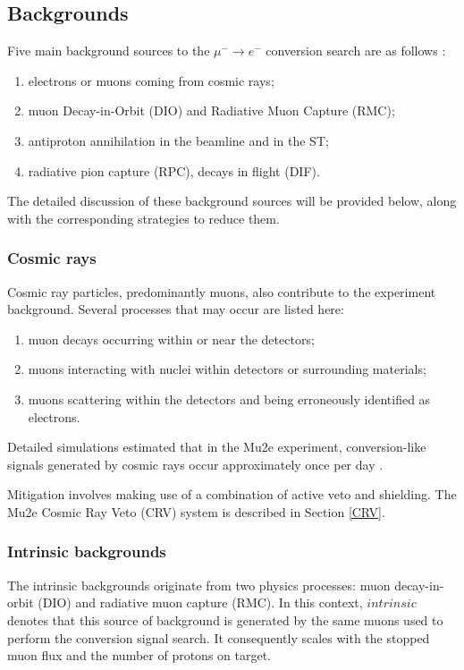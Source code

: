 \subsection{Backgrounds}\label{backgrounds}
Five main background sources to the $\mu^- \to e^-$ conversion search are as follows \cite{bartoszek2015mu2e}:
\begin{enumerate}
\item electrons or muons coming from cosmic rays;
\item muon Decay-in-Orbit (DIO) and Radiative Muon Capture (RMC);
\item antiproton annihilation in the beamline and in the ST;
  \item radiative pion capture (RPC), decays in flight (DIF).
\end{enumerate}
  
The detailed discussion of these background sources will be provided below, along with the 
corresponding strategies to reduce  
them. 
\subsubsection{Cosmic rays}
Cosmic ray particles, predominantly muons, also contribute to the experiment 
background. Several processes that may occur are listed here:
\begin{enumerate}
    \item muon decays occurring within or near the detectors;
    \item muons interacting with nuclei within detectors or surrounding materials;
    \item muons scattering within the detectors and being erroneously identified as electrons.
    
\end{enumerate}

Detailed simulations estimated that in the Mu2e experiment, 
conversion-like signals generated by cosmic rays occur approximately once per day \cite{CRVposter}.

Mitigation involves making use of a combination of active veto and shielding.
The Mu2e Cosmic Ray Veto (CRV) system is described in Section \ref{CRV}.

\subsubsection{Intrinsic backgrounds}
The intrinsic backgrounds originate from two physics processes: 
muon decay-in-orbit (DIO) and radiative muon capture (RMC). In this context, 
$intrinsic$ denotes that this source of background is generated by the same muons
used to perform the conversion signal search. It consequently scales with the
stopped muon flux and the number of protons on target.


